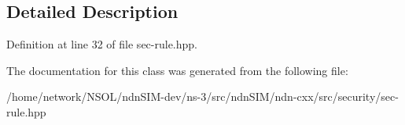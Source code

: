 \subsection{Detailed Description}


Definition at line 32 of file sec-\/rule.\+hpp.



The documentation for this class was generated from the following file\+:\begin{DoxyCompactItemize}
\item 
/home/network/\+N\+S\+O\+L/ndn\+S\+I\+M-\/dev/ns-\/3/src/ndn\+S\+I\+M/ndn-\/cxx/src/security/sec-\/rule.\+hpp\end{DoxyCompactItemize}

